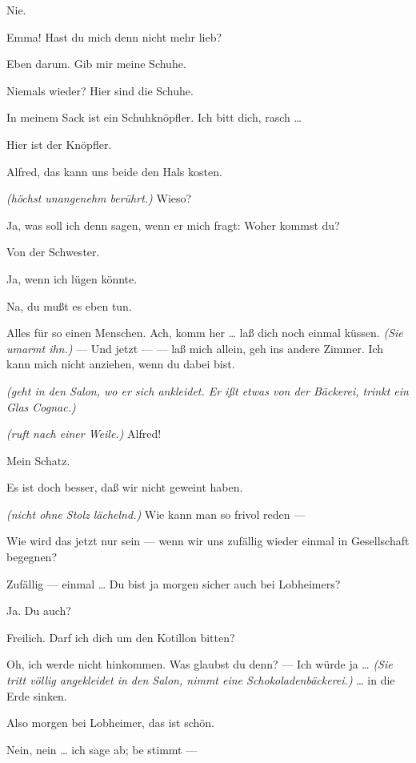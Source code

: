 \documentclass[
	final,
	a4paper,
	ngerman,
	mpinclude = true, %
	twoside = true,
	open = right,
	cleardoublepage = plain,
	DIV = 13,
	BCOR = 1cm,
	titlepage = firstiscover,
	]{scrbook}
\newcommand{\direction}[1]{\textit{(#1)}}
\newcommand{\thecharacter}[1]{\textup{\textsc{#1}}}
\newcommand{\theherr}{\thecharacter{Junger Herr}}
\newcommand{\thefrau}{\thecharacter{Junge Frau}}
\newcommand{\character}[1]{\item[#1:]}
\newcommand{\herr}{\character{\theherr}}
\newcommand{\frau}{\character{\thefrau}}
\begin{document}
\begin{play}
	\frau
	Nie.

	\herr
	Emma! Hast du mich denn nicht mehr lieb?

	\frau
	Eben darum. Gib mir meine Schuhe.

	\herr
	Niemals wieder? Hier sind die Schuhe.

	\frau
	In meinem Sack ist ein Schuhknöpfler. Ich bitt dich, rasch \ldots{}

	\herr
	Hier ist der Knöpfler.

	\frau
	Alfred, das kann uns beide den Hals kosten.

	\herr
	\direction{höchst unangenehm berührt.} Wieso?

	\frau
	Ja, was soll ich denn sagen, wenn er mich fragt: Woher kommst du?

	\herr
	Von der Schwester.

	\frau
	Ja, wenn ich lügen könnte.

	\herr
	Na, du mußt es eben tun.

	\frau
	Alles für so einen Menschen. Ach, komm her \ldots{} laß dich noch einmal küssen. \direction{Sie umarmt ihn.} --- Und jetzt --- --- laß mich allein, geh ins andere Zimmer. Ich kann mich nicht anziehen, wenn du dabei bist.

	\herr
	\direction{geht in den Salon, wo er sich ankleidet. Er ißt etwas von der Bäckerei, trinkt ein Glas Cognac.}

	\frau
	\direction{ruft nach einer Weile.} Alfred!

	\herr
	Mein Schatz.

	\frau
	Es ist doch besser, daß wir nicht geweint haben.

	\herr
	\direction{nicht ohne Stolz lächelnd.} Wie kann man so frivol reden ---

	\frau
	Wie wird das jetzt nur sein --- wenn wir uns zufällig wieder einmal in Gesellschaft begegnen?

	\herr
	Zufällig --- einmal \ldots{} Du bist ja morgen sicher auch bei Lobheimers?

	\frau
	Ja. Du auch?

	\herr
	Freilich. Darf ich dich um den Kotillon bitten?

	\frau
	Oh, ich werde nicht hinkommen. Was glaubst du denn? --- Ich würde ja \ldots{} \direction{Sie tritt völlig angekleidet in den Salon, nimmt eine Schokoladenbäckerei.} \ldots{} in die Erde sinken.

	\herr
	Also morgen bei Lobheimer, das ist schön.

	\frau
	Nein, nein \ldots{} ich sage ab; be stimmt ---


\end{play}
\end{document}

